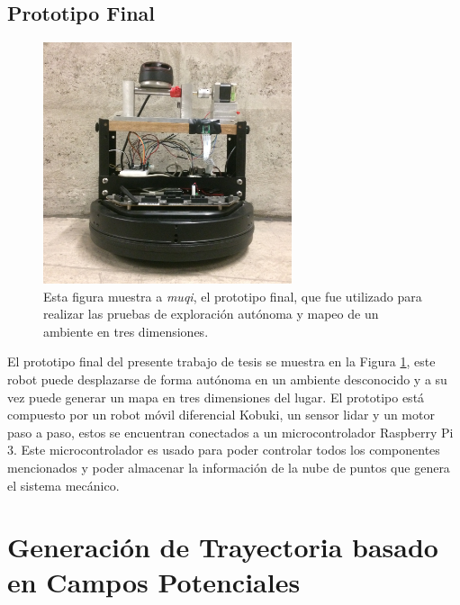 \subsection{Prototipo Final}
\begin{figure}%
	\centering \footnotesize
	\includegraphics[width=0.65\textwidth]{images/ProtFinal.JPG}
	\captionsetup{font=footnotesize}
	\caption{Esta figura muestra a \textit{muqi}, el prototipo final, que fue utilizado para 
	realizar las pruebas de exploración autónoma y mapeo de un ambiente en tres dimensiones. }
	\label{fig:ProtoFinal}
\end{figure}
El prototipo final del presente trabajo de tesis se muestra en la Figura \ref{fig:ProtoFinal}, 
este robot puede desplazarse de forma autónoma en un ambiente desconocido y a su vez 
puede generar un mapa en tres dimensiones del lugar. El prototipo está compuesto por un robot
móvil diferencial Kobuki, un sensor lidar y un motor paso a paso, estos se encuentran conectados
a un microcontrolador Raspberry Pi 3. Este microcontrolador es usado para poder controlar 
todos los componentes mencionados y poder almacenar la información de la nube de puntos que genera 
el sistema mecánico.



\section{Generación de Trayectoria basado en Campos Potenciales}
\label{sec:autonomia}

